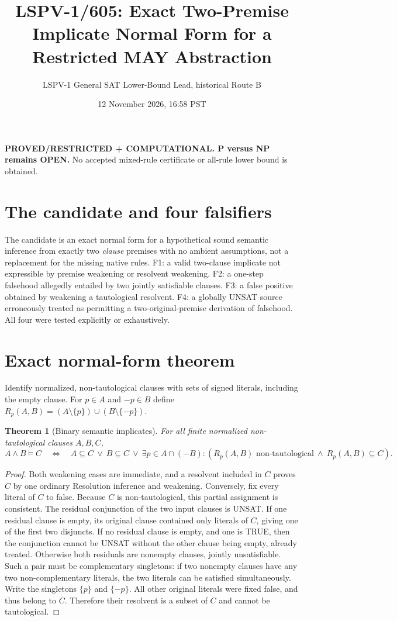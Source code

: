 \documentclass[11pt]{article}
\title{LSPV-1/605: Exact Two-Premise Implicate Normal Form for a Restricted MAY Abstraction}
\author{LSPV-1 General SAT Lower-Bound Lead, historical Route B}
\date{12 November 2026, 16:58 PST}
\newtheorem{theorem}{Theorem}
\begin{document}
\maketitle
\noindent\textbf{PROVED/RESTRICTED + COMPUTATIONAL. P versus NP remains OPEN.}
No accepted mixed-rule certificate or all-rule lower bound is obtained.

\section*{The candidate and four falsifiers}
The candidate is an exact normal form for a hypothetical sound semantic inference from exactly two \emph{clause} premises with no ambient assumptions, not a replacement for the missing native rules.
F1: a valid two-clause implicate not expressible by premise weakening or resolvent weakening.
F2: a one-step falsehood allegedly entailed by two jointly satisfiable clauses.
F3: a false positive obtained by weakening a tautological resolvent.
F4: a globally UNSAT source erroneously treated as permitting a two-original-premise derivation of falsehood. All four were tested explicitly or exhaustively.

\section*{Exact normal-form theorem}
Identify normalized, non-tautological clauses with sets of signed literals, including the empty clause. For $p\in A$ and $-p\in B$ define $R_p(A,B)=(A\setminus\{p\})\cup(B\setminus\{-p\})$.
\begin{theorem}[Binary semantic implicates]
For all finite normalized non-tautological clauses $A,B,C$,
\[
\boxed{A\land B\models C\quad\Longleftrightarrow\quad
 A\subseteq C\ \lor\ B\subseteq C\ \lor\
 \exists p\in A\cap(-B):
 (R_p(A,B)\text{ non-tautological}\ \land\ R_p(A,B)\subseteq C).}
\]
\end{theorem}
\begin{proof}
Both weakening cases are immediate, and a resolvent included in $C$ proves $C$ by one ordinary Resolution inference and weakening. Conversely, fix every literal of $C$ to false. Because $C$ is non-tautological, this partial assignment is consistent. The residual conjunction of the two input clauses is UNSAT. If one residual clause is empty, its original clause contained only literals of $C$, giving one of the first two disjuncts. If no residual clause is empty, and one is TRUE, then the conjunction cannot be UNSAT without the other clause being empty, already treated. Otherwise both residuals are nonempty clauses, jointly unsatisfiable. Such a pair must be complementary singletons: if two nonempty clauses have any two non-complementary literals, the two literals can be satisfied simultaneously. Write the singletons $\{p\}$ and $\{-p\}$. All other original literals were fixed false, and thus belong to $C$. Therefore their resolvent is a subset of $C$ and cannot be tautological.
\end{proof}
\end{document}
